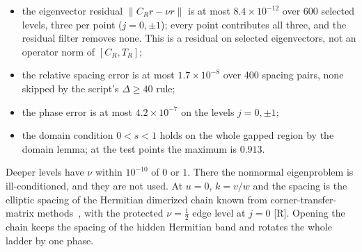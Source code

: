 \documentclass[11pt]{article}
\theoremstyle{definition}
\newcommand{\grade}[1]{\textsf{\small[#1]}}
\begin{document}
\begin{itemize}
\item the eigenvector residual $\|C_Rr-\nu r\|$ is at most $8.4\times10^{-12}$ over 600 selected levels, three per point ($j=0,\pm1$); every point contributes all three, and the residual filter removes none. This is a residual on selected eigenvectors, not an operator norm of $[C_R,T_R]$;
\item the relative spacing error is at most $1.7\times10^{-8}$ over 400 spacing pairs, none skipped by the script's $\Delta\ge40$ rule;
\item the phase error is at most $4.2\times10^{-7}$ on the levels $j=0,\pm1$;
\item the domain condition $0<s<1$ holds on the whole gapped region by the domain lemma; at the test points the maximum is $0.913$.
\end{itemize}
Deeper levels have $\nu$ within $10^{-10}$ of $0$ or $1$. There the nonnormal eigenproblem is ill-conditioned, and they are not used. At $u=0$, $k=v/w$ and the spacing is the elliptic spacing of the Hermitian dimerized chain known from corner-transfer-matrix methods~\cite{peschel04,peschelEisler09}, with the protected $\nu=\tfrac12$ edge level at $j=0$ \grade{R}. Opening the chain keeps the spacing of the hidden Hermitian band and rotates the whole ladder by one phase.
\end{document}
